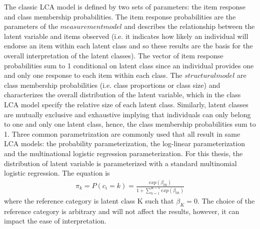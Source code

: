 The classic LCA model is defined by two sets of parameters: the item response and class membership probabilities. The item response probabilities are the parameters of the $measurement model$ and describes the relationship between the latent variable and items observed (i.e. it indicates how likely an individual will endorse an item within each latent class and so these results are the basis for the overall interpretation of the latent classes). The vector of item response probabilities sum to 1 conditional on latent class since an individual provides one and only one response to each item within each class. The $structural model$ are class membership probabilities (i.e. class proportions or class size) and characterizes the overall distribution of the latent variable, which in the class LCA model specify the relative size of each latent class. Similarly, latent classes are mutually exclusive and exhaustive implying that individuals can only belong to one and only one latent class, hence, the class membership probabilities sum to 1. Three common parametrization are commonly used that all result in same LCA models: the probability parameterization, the log-linear parameterization and the multinational logistic regression parameterization. For this thesis, the distribution of latent variable is parameterized with a standard multinomial logistic regression. The equation is
\begin{align}
    \pi_{k} = P(c_{i}=k) = \frac{exp(\beta_{0k})}{1 + \sum_{h=1}^{K-1}exp(\beta_{0h})}
\end{align} where the reference category is latent class K such that $\beta_{K}=0$. The choice of the reference category is arbitrary and will not affect the results, however, it can impact the ease of interpretation.

